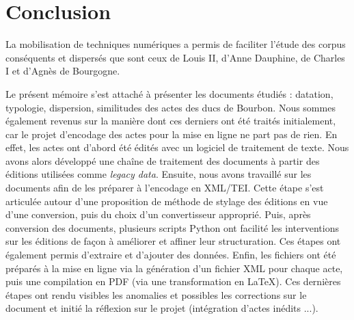 \chapter{Conclusion}

\par La mobilisation de techniques numériques a permis de faciliter l'étude des corpus conséquents et dispersés que sont ceux de Louis II, d'Anne Dauphine, de Charles I et d'Agnès de Bourgogne. 
\newline 

\par Le présent mémoire s'est attaché à présenter les documents étudiés : datation, typologie, dispersion, similitudes des actes des ducs de Bourbon. Nous sommes également revenus sur la manière dont ces derniers ont été traités initialement, car le projet d'encodage des actes pour la mise en ligne ne part pas de rien. En effet, les actes ont d'abord été édités avec un logiciel de traitement de texte. Nous avons alors développé une chaîne de traitement des documents à partir des éditions utilisées comme \textit{legacy data}. Ensuite, nous avons travaillé sur les documents afin de les préparer à l'encodage en XML/TEI. Cette étape s'est articulée autour d'une proposition de méthode de stylage des éditions en vue d'une conversion, puis du choix d'un convertisseur approprié. Puis, après conversion des documents, plusieurs scripts Python ont facilité les interventions sur les éditions de façon à améliorer et affiner leur structuration. Ces étapes ont également permis d'extraire et d'ajouter des données. Enfin, les fichiers ont été préparés à la mise en ligne via la génération d'un fichier XML pour chaque acte, puis une compilation en PDF (via une transformation en LaTeX). Ces dernières étapes ont rendu visibles les anomalies et possibles les corrections sur le document et initié la réflexion sur le projet (intégration d'actes inédits ...). 
\newline 

